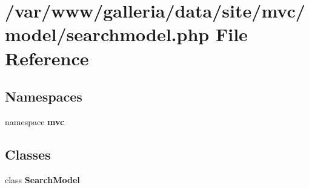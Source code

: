 \section{/var/www/galleria/data/site/mvc/model/searchmodel.php File Reference}
\label{searchmodel_8php}
\subsection*{Namespaces}
\begin{CompactItemize}
\item 
namespace {\bf mvc}
\end{CompactItemize}
\subsection*{Classes}
\begin{CompactItemize}
\item 
class {\bf SearchModel}
\end{CompactItemize}

